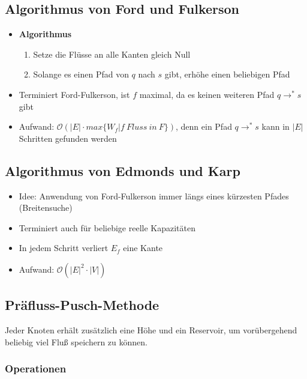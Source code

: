 \subsection{Algorithmus von Ford und Fulkerson}
\begin{itemize}
	\item \textbf{Algorithmus}
	\begin{enumerate}
		\item Setze die Flüsse an alle Kanten gleich Null
		\item Solange es einen Pfad von \(q\) nach \(s\) gibt, erhöhe einen beliebigen Pfad
	\end{enumerate}
	\item Terminiert Ford-Fulkerson, ist \(f\) maximal, da es keinen weiteren Pfad \(q \rightarrow^{*} s\) gibt
	\item Aufwand: \(\mathcal{O}(|E| \cdot max\{W_f | f~Fluss~in~F\})\), denn ein Pfad \(q \rightarrow^{*} s\) kann in \(|E|\) Schritten gefunden werden
\end{itemize}


\subsection{Algorithmus von Edmonds und Karp}
\begin{itemize}
	\item Idee: Anwendung von Ford-Fulkerson immer längs eines kürzesten Pfades (Breitensuche)
	\item Terminiert auch für beliebige reelle Kapazitäten
	\item In jedem Schritt verliert \(E_f\) eine Kante
	\item Aufwand: \(\mathcal{O} (|E|^2 \cdot |V|)\)
\end{itemize}


\subsection{Präfluss-Pusch-Methode}
Jeder Knoten erhält zusätzlich eine Höhe und ein Reservoir, um vorübergehend beliebig viel Fluß speichern zu können.

\subsubsection{Operationen}

